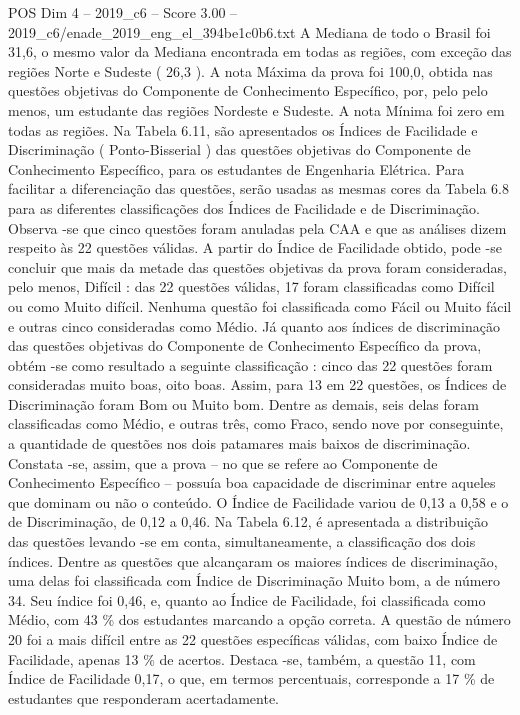 \begin{textsample}{POS Dim 4 – 2019\_c6 – Score 3.00 – 2019\_c6/enade\_2019\_eng\_el\_394be1c0b6.txt}
A Mediana de todo o Brasil foi 31,6, o mesmo valor da Mediana encontrada em todas as regiões, com exceção das regiões Norte e Sudeste ( 26,3 ).
A nota Máxima da prova foi 100,0, obtida nas questões objetivas do Componente de Conhecimento Específico, por, pelo pelo menos, um estudante das regiões Nordeste e Sudeste.
A nota Mínima foi zero em todas as regiões.
Na Tabela 6.11, são apresentados os Índices de Facilidade e Discriminação ( Ponto-Bisserial ) das questões objetivas do Componente de Conhecimento Específico, para os estudantes de Engenharia Elétrica.
Para facilitar a diferenciação das questões, serão usadas as mesmas cores da Tabela 6.8 para as diferentes classificações dos Índices de Facilidade e de Discriminação.
Observa -se que cinco questões foram anuladas pela CAA e que as análises dizem respeito às 22 questões válidas.
A partir do Índice de Facilidade obtido, pode -se concluir que mais da metade das questões objetivas da prova foram consideradas, pelo menos, Difícil : das 22 questões válidas, 17 foram classificadas como Difícil ou como Muito difícil.
Nenhuma questão foi classificada como Fácil ou Muito fácil e outras cinco consideradas como Médio.
Já quanto aos índices de discriminação das questões objetivas do Componente de Conhecimento Específico da prova, obtém -se como resultado a seguinte classificação : cinco das 22 questões foram consideradas muito boas, oito boas.
Assim, para 13 em 22 questões, os Índices de Discriminação foram Bom ou Muito bom.
Dentre as demais, seis delas foram classificadas como Médio, e outras três, como Fraco, sendo nove por conseguinte, a quantidade de questões nos dois patamares mais baixos de discriminação.
Constata -se, assim, que a prova – no que se refere ao Componente de Conhecimento Específico – possuía boa capacidade de discriminar entre aqueles que dominam ou não o conteúdo.
O Índice de Facilidade variou de 0,13 a 0,58 e o de Discriminação, de 0,12 a 0,46.
Na Tabela 6.12, é apresentada a distribuição das questões levando -se em conta, simultaneamente, a classificação dos dois índices.
Dentre as questões que alcançaram os maiores índices de discriminação, uma delas foi classificada com Índice de Discriminação Muito bom, a de número 34.
Seu índice foi 0,46, e, quanto ao Índice de Facilidade, foi classificada como Médio, com 43 \% dos estudantes marcando a opção correta.
A questão de número 20 foi a mais difícil entre as 22 questões específicas válidas, com baixo Índice de Facilidade, apenas 13 \% de acertos.
Destaca -se, também, a questão 11, com Índice de Facilidade 0,17, o que, em termos percentuais, corresponde a 17 \% de estudantes que responderam acertadamente.

\end{textsample}
